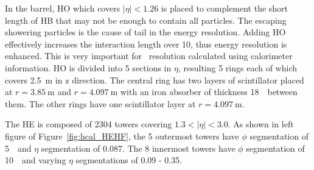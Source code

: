 In the barrel, HO which covers $|\eta|<1.26$ is placed to complement 
the short length of HB that may not be enough 
to contain all particles. The escaping showering particles 
is the cause of tail in the energy resolution. Adding HO effectively increases 
the interaction length over 10, thus energy resolution is enhanced.
This is very important for \met\ resolution calculated using calorimeter information. 
HO is divided into 5 sections in $\eta$, resulting 5 rings 
each of which covers 2.5~m in z direction. 
The central ring has two layers of scintillator placed at $r=3.85~\textrm{m}$ and 
$r=4.097~\textrm{m}$ with an iron absorber of thickness 18~\cm\ between them. 
The other rings have one scintillator layer at $r=4.097~\textrm{m}$.

The HE is composed of 2304 towers covering $1.3 < |\eta| < 3.0$. 
As shown in left figure of Figure~\ref{fig:hcal_HEHF}, the 5 outermost towers have 
$\phi$ segmentation of 5~\dg\ and $\eta$ segmentation of 0.087. 
The 8 innermost towers have 
$\phi$ segmentation of 10~\dg\ and varying $\eta$ segmentations of 0.09 - 0.35. 

